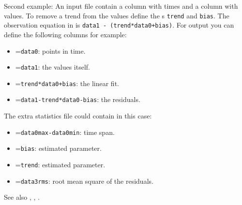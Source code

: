 Second example: An input file contain a column with times and a column with values.
To remove a trend from the values define the s \verb|trend| and \verb|bias|.
The observation equation in  is \verb|data1 - (trend*data0+bias)|.
For output you can define the following columns for example:
\begin{itemize}
\item {}=\verb|data0|: points in time.
\item {}=\verb|data1|: the values itself.
\item {}=\verb|trend*data0+bias|: the linear fit.
\item {}=\verb|data1-trend*data0-bias|: the residuals.
\end{itemize}
The extra statistics file could contain in this case:
\begin{itemize}
\item {}=\verb|data0max-data0min|: time span.
\item {}=\verb|bias|: estimated parameter.
\item {}=\verb|trend|: estimated parameter.
\item {}=\verb|data3rms|: root mean square of the residuals.
\end{itemize}

See also , , .


